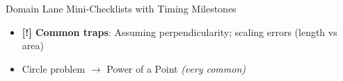 \documentclass{article}
\newcommand{\timer}[1]{\textbf{\textcolor{timegreen}{#1}}}
\begin{document}
\begin{classifybox}{Domain Lane Mini-Checklists with Timing Milestones}
\begin{itemize}[nosep]
        \begin{itemize}[nosep]
        \item Place origin at symmetry point
        \item Use simple integer coordinates
        \item Work with $d^2$ to avoid radicals: $(x_2-x_1)^2 + (y_2-y_1)^2$
        \item \emph{Hard cut at \timer{35s}: if no clean, near-term path (<10s arithmetic) is visible, trigger \hyperlink{pivot35}{35-Second Pivot Strategy}.}
        \end{itemize}
      \item \textbf{[!] Common traps}: Assuming perpendicularity; scaling errors (length vs area)
      \item {} Circle problem $\rightarrow$ Power of a Point \emph{(very common)}
      \end{itemize}
      
      \vspace{3mm}

\end{classifybox}
\end{document}
